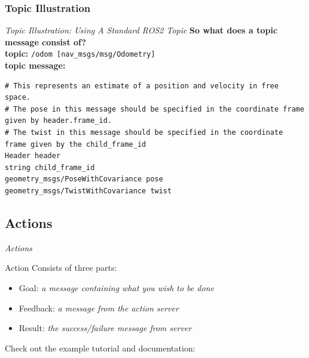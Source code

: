 \documentclass{beamer}
\begin{document}
\subsubsection{Topic Illustration}
\begin{frame}[fragile]{\textit{Topic Illustration: Using A Standard ROS2 Topic}}
    \textbf{So what does a topic message consist of?} \\
    \vspace{0.5cm} 
    \textbf{topic:} \verb|/odom [nav_msgs/msg/Odometry]| \\
    \textbf{topic message:} 
    \begingroup
    \fontsize{6pt}{12pt}\selectfont
    \begin{verbatim}
# This represents an estimate of a position and velocity in free space.  
# The pose in this message should be specified in the coordinate frame given by header.frame_id.
# The twist in this message should be specified in the coordinate frame given by the child_frame_id
Header header
string child_frame_id
geometry_msgs/PoseWithCovariance pose
geometry_msgs/TwistWithCovariance twist
    \end{verbatim}
    \endgroup

\end{frame}

\subsection{Actions}
\begin{frame}{\textit{Actions}}
    \vspace{0.5cm}
    \begin{block}{Action}
        Consists of three parts:
        \begin{itemize}
            \item Goal: \textit{a message containing what you wish to be done}
            \item Feedback: \textit{a message from the action server}
            \item Result: \textit{the success/failure message from server}
        \end{itemize}
    \end{block}
    \vspace{0.5cm}
    Check out the example tutorial and documentation:
    \href{https://docs.ros.org/en/iron/Tutorials/Beginner-CLI-Tools/Understanding-ROS2-Actions/Understanding-ROS2-Actions.html}{}
\end{frame}
\end{document}
